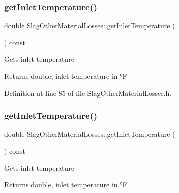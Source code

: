 \mbox{\label{class_slag_other_material_losses_aebd0f1b7d6c4bf0deb8ce8a86c5a80a7}} 
\subsubsection{\texorpdfstring{get\+Inlet\+Temperature()}{getInletTemperature()}\hspace{0.1cm}{\footnotesize\ttfamily [1/3]}}
{\footnotesize\ttfamily double Slag\+Other\+Material\+Losses\+::get\+Inlet\+Temperature (\begin{DoxyParamCaption}{ }\end{DoxyParamCaption}) const\hspace{0.3cm}{\ttfamily [inline]}}

Gets inlet temperature

\begin{DoxyReturn}{Returns}
double, inlet temperature in °F 
\end{DoxyReturn}


Definition at line 85 of file Slag\+Other\+Material\+Losses.\+h.

\mbox{\label{class_slag_other_material_losses_aebd0f1b7d6c4bf0deb8ce8a86c5a80a7}} 
\subsubsection{\texorpdfstring{get\+Inlet\+Temperature()}{getInletTemperature()}\hspace{0.1cm}{\footnotesize\ttfamily [2/3]}}
{\footnotesize\ttfamily double Slag\+Other\+Material\+Losses\+::get\+Inlet\+Temperature (\begin{DoxyParamCaption}{ }\end{DoxyParamCaption}) const\hspace{0.3cm}{\ttfamily [inline]}}

Gets inlet temperature

\begin{DoxyReturn}{Returns}
double, inlet temperature in °F 
\end{DoxyReturn}


